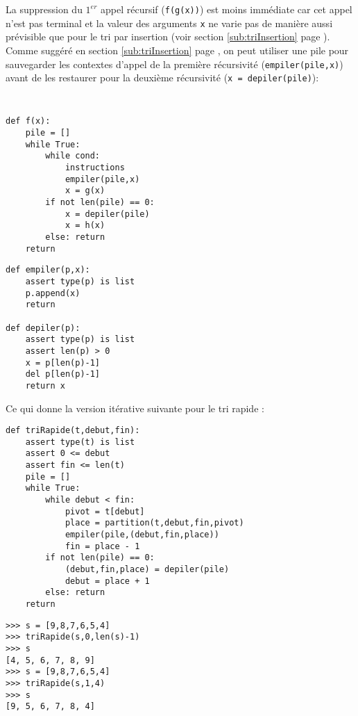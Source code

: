 \vspace*{2mm}

\noindent La suppression du $1^{er}$ appel récursif ({\tt f(g(x))}) est moins immédiate 
car cet appel n'est pas terminal et la valeur des arguments {\tt x} ne varie pas de 
manière aussi prévisible que pour le tri par insertion (voir section
\ref{sub:triInsertion} page \pageref{sub:triInsertion}). 
Comme suggéré en section \ref{sub:triInsertion} page \pageref{recursivite:pile}, 
on peut utiliser une pile pour sauvegarder les contextes d'appel de la première récursivité
({\tt empiler(pile,x)}) avant de les restaurer pour la deuxième récursivité 
({\tt x = depiler(pile)}):

\noindent\mbox{}\hspace*{1cm}\begin{py}{7cm}\tt
\begin{verbatim}
def f(x):
    pile = []
    while True:
        while cond:
            instructions
            empiler(pile,x)
            x = g(x)
        if not len(pile) == 0:
            x = depiler(pile)
            x = h(x)
        else: return
    return
\end{verbatim}
\end{py}
\hfill
\begin{py}{7cm}
\begin{verbatim}
def empiler(p,x):
    assert type(p) is list
    p.append(x)
    return

def depiler(p):
    assert type(p) is list
    assert len(p) > 0
    x = p[len(p)-1]
    del p[len(p)-1]
    return x
\end{verbatim}
\end{py}

\vspace*{2mm}

\newpage
\noindent Ce qui donne la version itérative suivante pour le tri rapide :

\noindent\mbox{}\hspace*{1cm}\begin{py}{8cm}
\begin{verbatim}
def triRapide(t,debut,fin):
    assert type(t) is list
    assert 0 <= debut 
    assert fin <= len(t)
    pile = []
    while True:
        while debut < fin:
            pivot = t[debut]
            place = partition(t,debut,fin,pivot)
            empiler(pile,(debut,fin,place))
            fin = place - 1
        if not len(pile) == 0:
            (debut,fin,place) = depiler(pile)
            debut = place + 1
        else: return
    return
\end{verbatim}
\end{py}
\hfill
\begin{py}{6cm}
\begin{verbatim}
>>> s = [9,8,7,6,5,4]
>>> triRapide(s,0,len(s)-1)
>>> s
[4, 5, 6, 7, 8, 9]
>>> s = [9,8,7,6,5,4]
>>> triRapide(s,1,4)
>>> s
[9, 5, 6, 7, 8, 4]
\end{verbatim}
\end{py}

